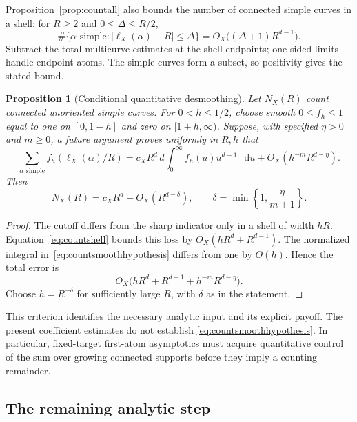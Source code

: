 \documentclass[11pt,a4paper]{article}
\numberwithin{equation}{section}
\newtheorem{proposition}[theorem]{Proposition}
\theoremstyle{definition}
\theoremstyle{remark}
\newcommand{\dd}{\mathop{}\!\mathrm d}
\begin{document}
Proposition~\ref{prop:countall} also bounds the number of connected
simple curves in a shell: for $R\geq2$ and $0\leq\Delta\leq R/2$,
\begin{equation}
 \#\{\alpha\text{ simple}:|\ell_X(\alpha)-R|\leq\Delta\}
       =O_X\bigl((\Delta+1)R^{d-1}\bigr).
 \label{eq:countshell}
\end{equation}
Subtract the total-multicurve estimates at the shell endpoints;
one-sided limits handle endpoint atoms.  The simple curves form a
subset, so positivity gives the stated bound.

\begin{proposition}[Conditional quantitative desmoothing]
\label{prop:countdesmooth}
Let $N_X(R)$ count connected unoriented simple curves.  For
$0<h\leq1/2$, choose smooth $0\leq f_h\leq1$
equal to one on $[0,1-h]$ and zero on
$[1+h,\infty)$.  Suppose, with specified $\eta>0$ and
$m\geq0$, a future argument proves uniformly in $R,h$ that
\begin{equation}
 \sum_{\alpha\text{ simple}}f_h(\ell_X(\alpha)/R)
 =c_XR^d\,d\!\int_0^\infty
             f_h(u)u^{d-1}\,\dd u
   +O_X(h^{-m}R^{d-\eta}).
 \label{eq:countsmoothhypothesis}
\end{equation}
Then
\begin{equation}
 \boxed{N_X(R)=c_XR^d+O_X(R^{d-\delta}),\qquad
        \delta=\min\left\{1,\frac\eta{m+1}\right\}.}
 \label{eq:countsharpconditional}
\end{equation}
\end{proposition}

\begin{proof}
The cutoff differs from the sharp indicator only in a shell of
width $h R$.  Equation~\eqref{eq:countshell} bounds this
loss by $O_X(h R^d+R^{d-1})$.  The normalized integral
in~\eqref{eq:countsmoothhypothesis} differs from one by
$O(h)$.  Hence the total error is
\[
 O_X\bigl(h R^d+R^{d-1}
                   +h^{-m}R^{d-\eta}\bigr).
\]
Choose $h=R^{-\delta}$ for sufficiently large $R$, with $\delta$ as in the statement.
\end{proof}

This criterion identifies the necessary analytic input and its
explicit payoff.  The present coefficient estimates do not establish
\eqref{eq:countsmoothhypothesis}.  In particular, fixed-target
first-atom asymptotics must acquire quantitative control of the
sum over growing connected supports before they imply a counting
remainder.

\subsection{The remaining analytic step}
\end{document}
